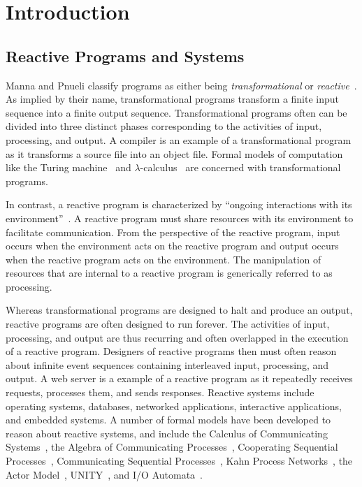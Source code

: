 \chapter{Introduction}
\label{introduction}

\section{Reactive Programs and Systems}

Manna and Pnueli classify programs as either being \emph{transformational} or \emph{reactive}~\cite{manna1992temporal}.
As implied by their name, transformational programs transform a finite input sequence into a finite output sequence.
Transformational programs often can be divided into three distinct phases corresponding to the activities of input, processing, and output.
A compiler is an example of a transformational program as it transforms a source file into an object file.
Formal models of computation like the Turing machine~\cite{turing1936computable} and $\lambda$-calculus~\cite{church1936unsolvable} are concerned with transformational programs.

In contrast, a reactive program is characterized by ``ongoing interactions with its environment''~\cite{manna1992temporal}.
A reactive program must share resources with its environment to facilitate communication.
From the perspective of the reactive program, input occurs when the environment acts on the reactive program and output occurs when the reactive program acts on the environment.
The manipulation of resources that are internal to a reactive program is generically referred to as processing.

Whereas transformational programs are designed to halt and produce an output, reactive programs are often designed to run forever.
The activities of input, processing, and output are thus recurring and often overlapped in the execution of a reactive program.
Designers of reactive programs then must often reason about infinite event sequences containing interleaved input, processing, and output.
A web server is a example of a reactive program as it repeatedly receives requests, processes them, and sends responses.
Reactive systems include operating systems, databases, networked applications, interactive applications, and embedded systems.
A number of formal models have been developed to reason about reactive systems, and include the Calculus of Communicating Systems~\cite{milner1982calculus}, the Algebra of Communicating Processes~\cite{bergstra1982fixed}, Cooperating Sequential Processes~\cite{dijkstra1965cooperating}, Communicating Sequential Processes~\cite{hoare1978communicating}, Kahn Process Networks~\cite{kahn1974semantics}, the Actor Model~\cite{hewitt1973universal}\cite{clinger1981foundations}\cite{agha1985actors}, UNITY~\cite{chandy1989parallel}, and I/O Automata~\cite{nancy1996distributed}.


